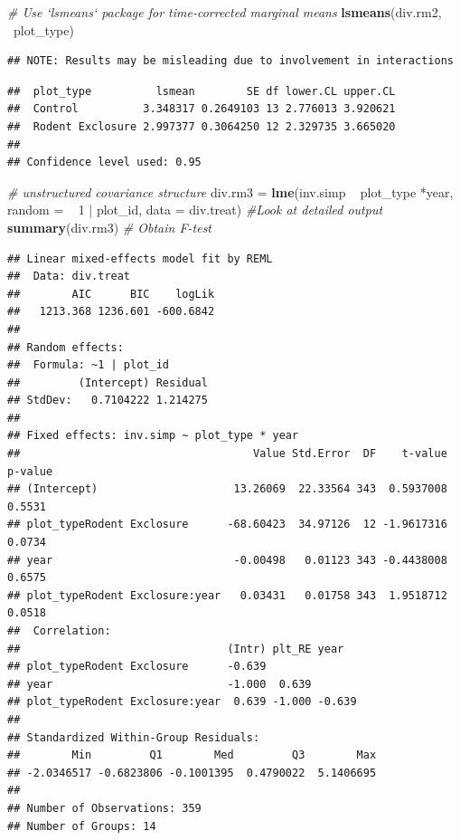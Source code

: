 \documentclass[]{article}
\newenvironment{Shaded}{\begin{snugshade}}{\end{snugshade}}
\newcommand{\KeywordTok}[1]{\textcolor[rgb]{0.13,0.29,0.53}{\textbf{{#1}}}}
\newcommand{\DataTypeTok}[1]{\textcolor[rgb]{0.13,0.29,0.53}{{#1}}}
\newcommand{\DecValTok}[1]{\textcolor[rgb]{0.00,0.00,0.81}{{#1}}}
\newcommand{\StringTok}[1]{\textcolor[rgb]{0.31,0.60,0.02}{{#1}}}
\newcommand{\CommentTok}[1]{\textcolor[rgb]{0.56,0.35,0.01}{\textit{{#1}}}}
\newcommand{\NormalTok}[1]{{#1}}
\begin{document}
\begin{Shaded}
\begin{Highlighting}[]
\CommentTok{# Use `lsmeans` package for time-corrected marginal means}
\KeywordTok{lsmeans}\NormalTok{(div.rm2, ~plot_type)}
\end{Highlighting}
\end{Shaded}

\begin{verbatim}
## NOTE: Results may be misleading due to involvement in interactions
\end{verbatim}

\begin{verbatim}
##  plot_type          lsmean        SE df lower.CL upper.CL
##  Control          3.348317 0.2649103 13 2.776013 3.920621
##  Rodent Exclosure 2.997377 0.3064250 12 2.329735 3.665020
## 
## Confidence level used: 0.95
\end{verbatim}

\begin{Shaded}
\begin{Highlighting}[]
\CommentTok{# unstructured covariance structure}
\NormalTok{div.rm3 =}\StringTok{ }\KeywordTok{lme}\NormalTok{(inv.simp ~}\StringTok{ }\NormalTok{plot_type *year, }\DataTypeTok{random =} \NormalTok{~}\StringTok{ }\DecValTok{1} \NormalTok{|}\StringTok{ }\NormalTok{plot_id, }\DataTypeTok{data =} \NormalTok{div.treat) }
\CommentTok{#Look at detailed output}
\KeywordTok{summary}\NormalTok{(div.rm3) }\CommentTok{# Obtain F-test}
\end{Highlighting}
\end{Shaded}

\begin{verbatim}
## Linear mixed-effects model fit by REML
##  Data: div.treat 
##        AIC      BIC    logLik
##   1213.368 1236.601 -600.6842
## 
## Random effects:
##  Formula: ~1 | plot_id
##         (Intercept) Residual
## StdDev:   0.7104222 1.214275
## 
## Fixed effects: inv.simp ~ plot_type * year 
##                                    Value Std.Error  DF    t-value p-value
## (Intercept)                     13.26069  22.33564 343  0.5937008  0.5531
## plot_typeRodent Exclosure      -68.60423  34.97126  12 -1.9617316  0.0734
## year                            -0.00498   0.01123 343 -0.4438008  0.6575
## plot_typeRodent Exclosure:year   0.03431   0.01758 343  1.9518712  0.0518
##  Correlation: 
##                                (Intr) plt_RE year  
## plot_typeRodent Exclosure      -0.639              
## year                           -1.000  0.639       
## plot_typeRodent Exclosure:year  0.639 -1.000 -0.639
## 
## Standardized Within-Group Residuals:
##        Min         Q1        Med         Q3        Max 
## -2.0346517 -0.6823806 -0.1001395  0.4790022  5.1406695 
## 
## Number of Observations: 359
## Number of Groups: 14
\end{verbatim}
\end{document}
